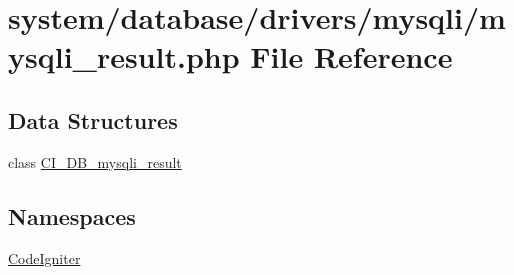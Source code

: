 \hypertarget{mysqli__result_8php}{\section{system/database/drivers/mysqli/mysqli\-\_\-result.php File Reference}
\label{mysqli__result_8php}
}
\subsection*{Data Structures}
\begin{DoxyCompactItemize}
\item 
class \hyperlink{class_c_i___d_b__mysqli__result}{C\-I\-\_\-\-D\-B\-\_\-mysqli\-\_\-result}
\end{DoxyCompactItemize}
\subsection*{Namespaces}
\begin{DoxyCompactItemize}
\item 
\hyperlink{namespace_code_igniter}{Code\-Igniter}
\end{DoxyCompactItemize}
